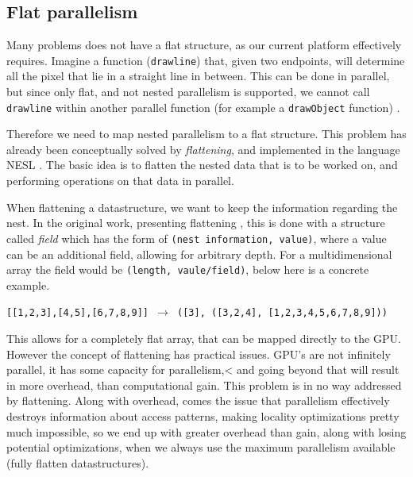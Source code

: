 \subsection{Flat parallelism}
Many problems does not have a flat structure, as our current platform effectively requires. Imagine a function (\texttt{drawline}) that, given two endpoints, will determine all the pixel that lie in a straight line in between. This can be done in parallel, but since only flat, and not nested parallelism is supported, we cannot call \texttt{drawline} within another parallel function (for example a \texttt{drawObject} function) \cite{flat}. 

Therefore we need to map nested parallelism to a flat structure. This problem has already been conceptually solved by \textit{flattening}, and implemented in the language NESL \cite{nesl}. The basic idea is to flatten the nested data that is to be worked on, and performing operations on that data in parallel. 

When flattening a datastructure, we want to keep the information regarding the nest. In the original work, presenting flattening \cite{flat}, this is done with a structure called \textit{field} which has the form of \texttt{(nest information, value)}, where a value can be an additional field, allowing for arbitrary depth. For a multidimensional array the field would be \texttt{(length, vaule/field)}, below here is a concrete example.
\begin{center}
\texttt{[[1,2,3],[4,5],[6,7,8,9]] $\to$ ([3], ([3,2,4], [1,2,3,4,5,6,7,8,9]))}
\end{center}
This allows for a completely flat array, that can be mapped directly to the GPU. However the concept of flattening has practical issues. GPU's are not infinitely parallel, it has some capacity for parallelism,< and going beyond that will result in more overhead, than computational gain. This problem is in no way addressed by flattening. Along with overhead, comes the issue that parallelism effectively destroys information about access patterns, making locality optimizations pretty much impossible, so we end up with greater overhead than gain, along with losing potential optimizations, when we always use the maximum parallelism available (fully flatten datastructures). 

